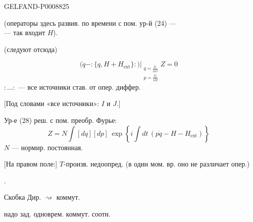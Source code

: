\begin{GelfandAdjacentEvidence}{GELFAND-P000882}{5}


(операторы здесь развив. по времени с пом. ур-й (24) ---\\
--- так входит $H$).

 (следуют отсюда)

\end{GelfandAdjacentEvidence}

\begin{equation*}
\left.\bigl(\dot q-:\{q,H+H_{\mathrm{ext}}\}:\bigr)\right|_{\substack{
q=\frac{\delta_r}{i\delta J}\\
p=\frac{\delta_\ell}{i\delta I}}}Z=0
\tag{28}
\end{equation*}
$:\ldots:$ --- все источники став.  от опер. диффер.

[Под словами «все источники»: $I$ и $J$.]

Ур-е (28) реш. с пом. преобр. Фурье:
\begin{equation*}
Z=N\int[dq][dp]\,\exp\left\{i\int dt\,(p\dot q-H-H_{\mathrm{ext}})\right\}
\tag{29}
\end{equation*}
$N$ --- нормир. постоянная.

[На правом поле:] $T$-произв. недоопред. (в один мом. вр. оно не различает опер.)

.

Скобка Дир. $\rightsquigarrow$ коммут.

надо зад. одноврем. коммут. соотн.


